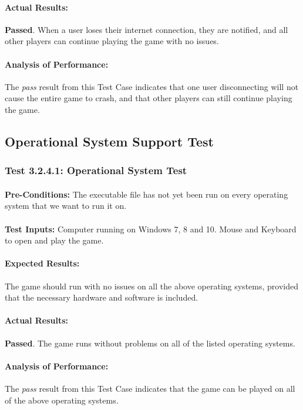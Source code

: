 \documentclass{article}
\begin{document}
    \paragraph{Actual Results:} \textbf{Passed}. When a user loses their internet connection, they are notified, and all other players can continue playing the game with no issues.
    \paragraph{Analysis of Performance:} The \emph{pass} result from this Test Case indicates that one user disconnecting will not cause the entire game to crash, and that other players can still continue playing the game.
\subsection{Operational System Support Test}
\subsubsection{Test 3.2.4.1: Operational System Test }
    \paragraph{}\textbf{Pre-Conditions:} The executable file has not yet been run on every operating system that we want to run it on.
    \paragraph{}\textbf{Test Inputs:} Computer running on Windows 7, 8 and 10. Mouse and Keyboard to open and play the game.
    \paragraph{Expected Results:} The game should run with no issues on all the above operating systems, provided that the necessary hardware and software is included.
    \paragraph{Actual Results:} \textbf{Passed}. The game runs without problems on all of the listed operating systems. 
    \paragraph{Analysis of Performance:} The \emph{pass} result from this Test Case indicates that the game can be played on all of the above operating systems.
\end{document}
